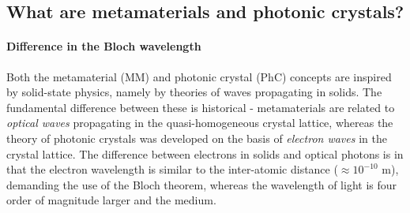 



\subsection{What are metamaterials and photonic crystals?} %
\paragraph{Difference in the Bloch wavelength}%
Both the metamaterial (MM) and photonic crystal (PhC) concepts are inspired by solid-state physics, namely by theories of waves propagating in solids. The fundamental difference between these is historical - metamaterials are related to \textit{optical waves} propagating in the quasi-homogeneous crystal lattice, whereas the theory of photonic crystals was developed on the basis of \textit{electron waves} in the crystal lattice. The difference between electrons in solids and optical photons is in that the electron wavelength is similar to the inter-atomic distance ($\approx 10^{-10}$ m), demanding the use of the Bloch theorem, whereas the wavelength of light is four order of magnitude larger and the medium.


